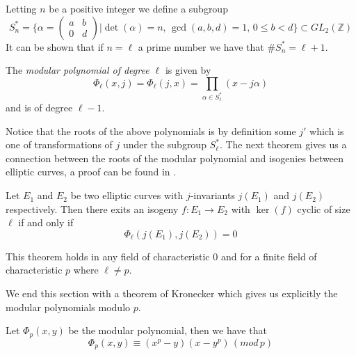 Letting $n$ be a positive integer we define a subgroup
$$ S_n^* = \{ \alpha = \begin{pmatrix} a & b \\ 0 & d \end{pmatrix} | \det(\alpha)=n,\, \gcd(a,b,d)=1,\, 0 \leq b < d \} \subset GL_2(\mathbb{Z}) $$
It can be shown that if $n = \ell$ a prime number we have that $\#S_n^* = \ell + 1$.

\begin{mydef}
 The \emph{modular polynomial of degree $\ell$} is given by
$$\Phi_\ell(x,j) = \Phi_\ell(j,x) = \prod_{\alpha \in S_\ell^*}(x - j \alpha) $$
and is of degree $\ell-1$.
\end{mydef}
Notice that the roots of the above polynomials is by definition some $j'$ which is one of transformations
of $j$ under the subgroup $S_\ell^*$. The next theorem gives us a connection between the roots of the
modular polynomial and isogenies between elliptic curves, a proof can be found in \cite{Lang2}.

\begin{thm} \label{modpol}
 Let $E_1$ and $E_2$ be two elliptic curves with $j$-invariants $j(E_1)$ and $j(E_2)$ respectively.
Then there exits an isogeny $f: E_1 \rightarrow E_2$ with $\ker(f)$ cyclic of size $\ell$ if and only if
$$\Phi_\ell(j(E_1), j(E_2)) = 0 $$
\end{thm}

This theorem holds in any field of characteristic $0$ and for a finite field of characteristic $p$ where
$\ell \neq p$.

We end this section with a theorem of Kronecker which gives us explicitly the modular polynomials
modulo $p$.
\begin{thm} \label{kroenecker}
 Let $\Phi_p(x,y)$ be the modular polynomial, then we have that
$$ \Phi_p(x,y) \equiv (x^p-y)(x-y^p)\,(mod\,p)$$
\end{thm}
